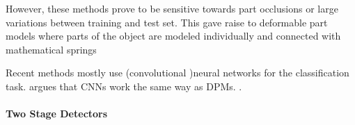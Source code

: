 	However, these methods prove to be sensitive towards part occlusions or large variations between training and test set. This gave raise to deformable part models where parts of the object are modeled individually and connected with mathematical springs 
	
	Recent methods mostly use (convolutional )neural networks for the classification task.  argues that \acp{CNN} work the same way as DPMs.
	\cite{Viola2004}.

	\paragraph{Two Stage Detectors}
			
